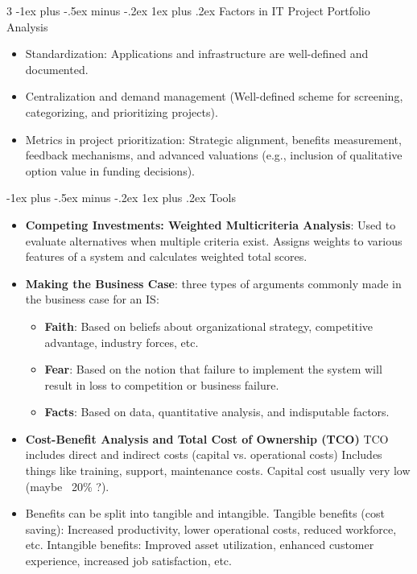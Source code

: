\documentclass[10pt, landscape]{article}
\makeatletter
\renewcommand{\subsubsection}{\@startsection{subsubsection}{3}{0mm}%
                                {-1ex plus -.5ex minus -.2ex}%
                                {1ex plus .2ex}%
                                {\normalfont\small\bfseries}}
\makeatother
\begin{document}
\begin{multicols*}{3}
\subsubsection{Factors in IT Project Portfolio Analysis}
\begin{itemize}[itemsep=-1pt]
    \item Standardization: Applications and infrastructure are well-defined and documented.
    \item Centralization and demand management (Well-defined scheme for screening, categorizing, and prioritizing projects).
    \item Metrics in project prioritization: Strategic alignment, benefits measurement, feedback mechanisms, and advanced valuations (e.g., inclusion of qualitative option value in funding decisions).
\end{itemize}

\subsubsection{Tools}
\begin{itemize}
\item \textbf{Competing Investments: Weighted Multicriteria Analysis}: Used to evaluate alternatives when multiple criteria exist. Assigns weights to various features of a system and calculates weighted total scores.
\item \textbf{Making the Business Case}: three types of arguments commonly made in the business case for an IS:
    \begin{itemize}
        \item \textbf{Faith}: Based on beliefs about organizational strategy, competitive advantage, industry forces, etc.
        \item \textbf{Fear}: Based on the notion that failure to implement the system will result in loss to competition or business failure.
        \item \textbf{Facts}: Based on data, quantitative analysis, and indisputable factors.
    \end{itemize}
\item \textbf{Cost-Benefit Analysis and Total Cost of Ownership (TCO)} TCO includes direct and indirect costs (capital vs. operational costs) Includes things like training, support, maintenance costs. Capital cost usually very low (maybe ~20\% ?). 
\item Benefits can be split into tangible and intangible. Tangible benefits (cost saving): Increased productivity, lower operational costs, reduced workforce, etc. Intangible benefits: Improved asset utilization, enhanced customer experience, increased job satisfaction, etc.
\end{itemize}


\end{multicols*}
\end{document}
